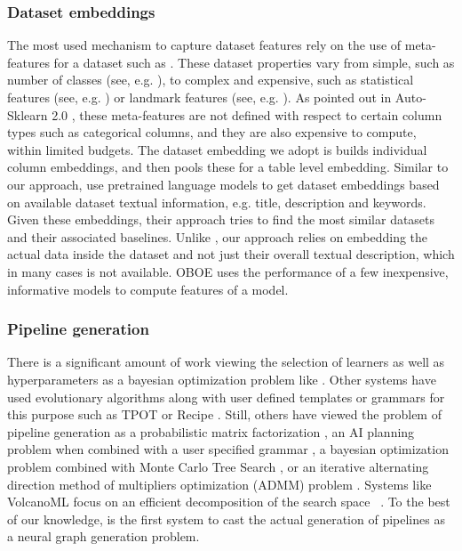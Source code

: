 \subsubsection*{Dataset embeddings}
The most used mechanism to capture dataset features rely on the use of meta-features for a dataset such as \cite{autosklearn,Reif2012}.  These dataset properties vary from simple, such as number of classes (see, e.g. \cite{Engels98usinga}), to complex and expensive, such as statistical features (see, e.g. \cite{Vilalta_usingmeta-learning}) or landmark features (see, e.g. \cite{Pfahringer00meta-learningby}).  As pointed out in Auto-Sklearn 2.0 \cite{autosklearn2}, these meta-features are not defined with respect to certain column types such as categorical columns, and they are also expensive to compute, within limited budgets.  The dataset embedding we adopt is builds individual column embeddings, and then pools these for a table level embedding.  Similar to our approach, \citet{drori2019automl} use pretrained language models to get dataset embeddings based on available dataset textual information, e.g. title, description and keywords. Given these embeddings, their approach tries to find the most similar datasets and their associated baselines. Unlike \cite{drori2019automl}, our approach relies on embedding the actual data inside the dataset and not just their overall textual description, which in many cases is not available. OBOE \cite{Yang_2019} uses the performance of a few inexpensive, informative models to compute features of a model.

\subsubsection*{Pipeline generation}
There is a significant amount of work viewing the selection of learners as well as hyperparameters as a bayesian optimization problem like \cite{multitaskBO,autoweka}.  Other systems have used evolutionary algorithms along with user defined templates or grammars for this purpose such as TPOT \cite{le2020scaling} or Recipe \cite{S2017RECIPEAG}.  Still, others have viewed the problem of pipeline generation as a probabilistic matrix factorization \cite{NEURIPS2018_b59a51a3}, an AI planning problem when combined with a user specified grammar \cite{ICAPS20paper208,Ml-plan}, a bayesian optimization problem combined with Monte Carlo Tree Search \cite{ijcai2019-457}, or an iterative alternating direction method of multipliers optimization (ADMM) problem \cite{liu2019admm}.  Systems like VolcanoML focus on an efficient decomposition of the search space ~\cite{VolcanoML}. To the best of our knowledge, %
{\sysname} is the first system to cast the actual generation of pipelines as a neural graph generation problem.


